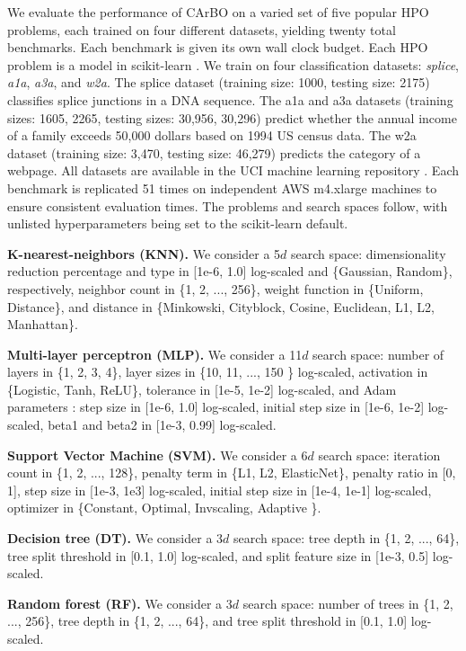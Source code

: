 \documentclass{article}
\begin{document}
We evaluate the performance of CArBO on a varied set of five popular HPO problems, each trained on four different datasets, yielding twenty total benchmarks. Each benchmark is given its own wall clock budget. Each HPO problem is a model in scikit-learn \cite{scikit-learn}. We train on four classification datasets: \textit{splice}, \textit{a1a}, \textit{a3a}, and \textit{w2a}. The splice dataset (training size: 1000, testing size: 2175) classifies splice junctions in a DNA sequence. The a1a and a3a datasets (training sizes: 1605, 2265, testing sizes: 30,956, 30,296) predict whether the annual income of a family exceeds 50,000 dollars based on 1994 US census data. The w2a dataset (training size: 3,470, testing size: 46,279) predicts the category of a webpage. All datasets are available in the UCI machine learning repository \cite{Dua:2019}. Each benchmark is replicated 51 times on independent AWS m4.xlarge machines to ensure consistent evaluation times. The problems and search spaces follow, with unlisted hyperparameters being set to the scikit-learn default. 

\textbf{K-nearest-neighbors (KNN).} We consider a 5$d$ search space: dimensionality reduction percentage and type in [1e-6, 1.0] log-scaled and \{Gaussian, Random\}, respectively, neighbor count in \{1, 2, ..., 256\}, weight function in \{Uniform, Distance\}, and distance in \{Minkowski, Cityblock, Cosine, Euclidean, L1, L2, Manhattan\}. 

\textbf{Multi-layer perceptron (MLP).} We consider a 11$d$ search space: number of layers in \{1, 2, 3, 4\}, layer sizes in \{10, 11, ..., 150 \} log-scaled, activation in \{Logistic, Tanh, ReLU\}, tolerance in [1e-5, 1e-2] log-scaled, and Adam parameters \cite{kingma2014adam}: step size in [1e-6, 1.0] log-scaled, initial step size in [1e-6, 1e-2] log-scaled, beta1 and beta2 in [1e-3, 0.99] log-scaled.

\textbf{Support Vector Machine (SVM).} We consider a 6$d$ search space: iteration count in \{1, 2, ..., 128\}, penalty term in \{L1, L2, ElasticNet\}, penalty ratio in [0, 1], step size in [1e-3, 1e3] log-scaled, initial step size in [1e-4, 1e-1] log-scaled, optimizer in \{Constant, Optimal, Invscaling, Adaptive \}. 

\textbf{Decision tree (DT).} We consider a 3$d$ search space: tree depth in \{1, 2, ..., 64\}, tree split threshold in [0.1, 1.0] log-scaled, and split feature size in [1e-3, 0.5] log-scaled. 

\textbf{Random forest (RF).} We consider a 3$d$ search space: number of trees in \{1, 2, ..., 256\}, tree depth in \{1, 2, ..., 64\}, and tree split threshold in [0.1, 1.0] log-scaled. 
\end{document}
